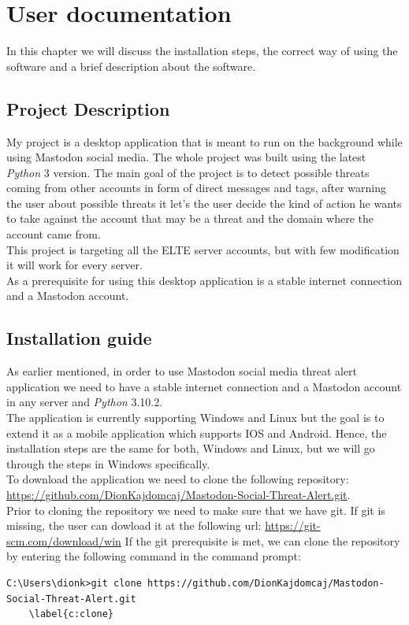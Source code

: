 \chapter{User documentation}
\label{ch:user}

In this chapter we will discuss the installation steps,
the correct way of using the software and a brief description
about the software.


\section{Project Description}
\label{s:project_desc}

My project is a desktop application that is meant to run 
on the background while using Mastodon social media. The
whole project was built using the latest \textit{Python} 3 version.
The main goal of the project is to detect possible
threats coming from other accounts in form of direct
messages and tags, after warning the user about possible 
threats it let's the user decide the kind of action
he wants to take against the account that may be a threat
and the domain where the account came from.
\\[5pt]
This project is targeting all the ELTE server accounts, but with few modification
it will work for every server.
\\[5pt]
As a prerequisite for using this desktop application is
a stable internet connection and a Mastodon account.


\section{Installation guide}
\label{s:installation_guide}
As earlier mentioned, in order to use Mastodon social media threat alert application
we need to have a stable internet connection and a Mastodon account in any server and \textit{Python} 3.10.2.
\\[5pt]
The application is currently supporting Windows and Linux but the goal is to extend it as a 
mobile application which supports IOS and Android. Hence, the installation steps are the same for
both, Windows and Linux, but we will go through the steps in Windows specifically.
\\[5pt]
To download the application we need to clone the following repository: 
\url{https://github.com/DionKajdomcaj/Mastodon-Social-Threat-Alert.git}.
\\[5pt]
Prior to cloning the repository we need to make sure that we have git.
If git is missing, the user can dowload it at the
following url: \url{https://git-scm.com/download/win}
If the git prerequisite is met, we can clone the repository by
entering the following command in the command prompt:
\\[5pt]
\begin{lstlisting}[caption=Cloning Repository, captionpos=b]
	C:\Users\dionk>git clone https://github.com/DionKajdomcaj/Mastodon-Social-Threat-Alert.git
	\label{c:clone}
\end{lstlisting}

